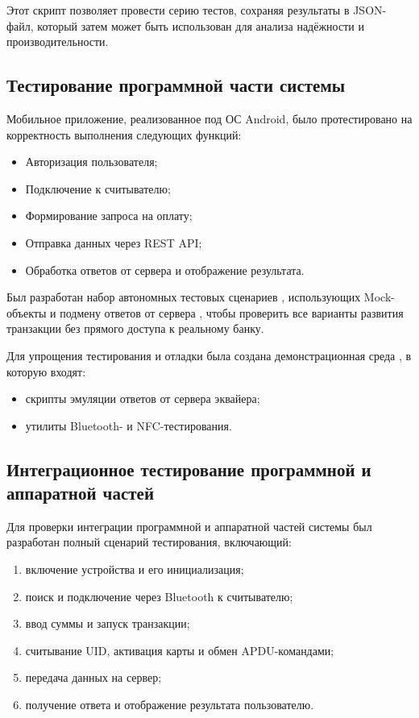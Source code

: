 Этот скрипт позволяет провести серию тестов, сохраняя результаты в JSON-файл, который затем может быть использован для анализа надёжности и производительности.



\subsection{Тестирование программной части системы}
Мобильное приложение, реализованное под ОС Android, было протестировано на корректность выполнения следующих функций:

\begin{itemize}
\item Авторизация пользователя;
\item Подключение к считывателю;
\item Формирование запроса на оплату;
\item Отправка данных через REST API;
\item Обработка ответов от сервера и отображение результата.
\end{itemize}

Был разработан набор автономных тестовых сценариев , использующих Mock-объекты и подмену ответов от сервера , чтобы проверить все варианты развития транзакции без прямого доступа к реальному банку.


Для упрощения тестирования и отладки была создана демонстрационная среда , в которую входят:

\begin{itemize}
	\item скрипты эмуляции ответов от сервера эквайера;
	\item утилиты Bluetooth- и NFC-тестирования.
\end{itemize}

\subsection{Интеграционное тестирование программной и аппаратной частей}
\label{subsec:test_integr}
Для проверки интеграции программной и аппаратной частей системы был разработан полный сценарий тестирования, включающий:

\begin{enumerate}
	\item включение устройства и его инициализация;
	\item поиск и подключение через Bluetooth к считывателю;
	\item ввод суммы и запуск транзакции;
	\item считывание UID, активация карты и обмен APDU-командами;
	\item передача данных на сервер;
	\item получение ответа и отображение результата пользователю.
\end{enumerate}


